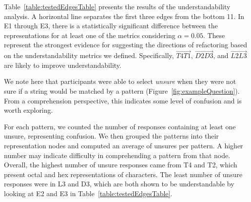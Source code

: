 Table~\ref{table:testedEdgesTable} presents the results of the understandability analysis. A horizontal line separates the first three edges from the bottom 11. In E1 through E3, there is a statistically significant difference between the representations for at least one of the metrics considering $\alpha = 0.05$.  These represent the strongest evidence for suggesting the directions of refactoring based on the understandability metrics we defined. Specifically, $\overrightarrow{T4 T1}$, $\overrightarrow{D2 D3}$, and $\overrightarrow{L2 L3}$
are likely to improve understandability.

We note here that participants were able to select \emph{unsure} when they were not sure if a string would be matched by a pattern (Figure~\ref{fig:exampleQuestion}). From a comprehension perspective, this indicates some level of confusion and is worth exploring.



For each pattern, we counted the number of responses containing at least one unsure, representing confusion.
We then grouped the patterns into their representation nodes and computed an average of unsures per pattern.
A higher number may indicate difficulty in comprehending a pattern from that node.
Overall, the highest number of unsure responses came from T4 and T2, which present octal and hex representations of characters. The least number of unsure responses were in L3 and D3, which are both shown to be understandable by looking at E2 and E3 in Table~\ref{table:testedEdgesTable}.

